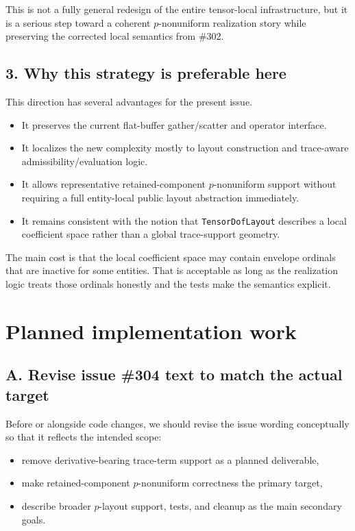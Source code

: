\documentclass[11pt]{article}
\begin{document}
This is not a fully general redesign of the entire tensor-local infrastructure, but it is a serious step toward a coherent \(p\)-nonuniform realization story while preserving the corrected local semantics from \#302.

\subsection{3. Why this strategy is preferable here}

This direction has several advantages for the present issue.

\begin{itemize}[leftmargin=*]
  \item It preserves the current flat-buffer gather/scatter and operator interface.
  \item It localizes the new complexity mostly to layout construction and trace-aware admissibility/evaluation logic.
  \item It allows representative retained-component \(p\)-nonuniform support without requiring a full entity-local public layout abstraction immediately.
  \item It remains consistent with the notion that \texttt{TensorDofLayout} describes a local coefficient space rather than a global trace-support geometry.
\end{itemize}

The main cost is that the local coefficient space may contain envelope ordinals that are inactive for some entities. That is acceptable as long as the realization logic treats those ordinals honestly and the tests make the semantics explicit.

\section{Planned implementation work}

\subsection{A. Revise issue \#304 text to match the actual target}

Before or alongside code changes, we should revise the issue wording conceptually so that it reflects the intended scope:
\begin{itemize}[leftmargin=*]
  \item remove derivative-bearing trace-term support as a planned deliverable,
  \item make retained-component \(p\)-nonuniform correctness the primary target,
  \item describe broader \(p\)-layout support, tests, and cleanup as the main secondary goals.
\end{itemize}
\end{document}
